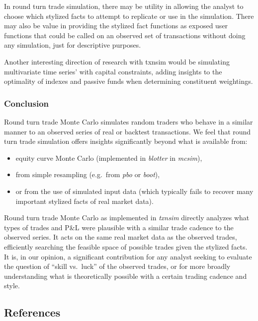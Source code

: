 In round turn trade simulation, there may be utility in allowing the
analyst to choose which stylized facts to attempt to replicate or use in
the simulation. There may also be value in providing the stylized fact
functions as exposed user functions that could be called on an observed
set of transactions without doing any simulation, just for descriptive
purposes.

Another interesting direction of research with txnsim would be
simulating multivariate time series' with capital constraints, adding
insights to the optimality of indexes and passive funds when determining
constituent weightings.

\hypertarget{conclusion}{%
\subsubsection{Conclusion}\label{conclusion}}

Round turn trade Monte Carlo simulates random traders who behave in a
similar manner to an observed series of real or backtest transactions.
We feel that round turn trade simulation offers insights significantly
beyond what is available from:

\begin{itemize}
\tightlist
\item
  equity curve Monte Carlo (implemented in \emph{blotter} in
  \emph{mcsim}),
\item
  from simple resampling (e.g.~from \emph{pbo} or \emph{boot}),
\item
  or from the use of simulated input data (which typically fails to
  recover many important stylized facts of real market data).
\end{itemize}

Round turn trade Monte Carlo as implemented in \emph{txnsim} directly
analyzes what types of trades and P\&L were plausible with a similar
trade cadence to the observed series. It acts on the same real market
data as the observed trades, efficiently searching the feasible space of
possible trades given the stylized facts. It is, in our opinion, a
significant contribution for any analyst seeking to evaluate the
question of ``skill vs.~luck'' of the observed trades, or for more
broadly understanding what is theoretically possible with a certain
trading cadence and style.

\hypertarget{references}{%
\subsection{References}\label{references}}

